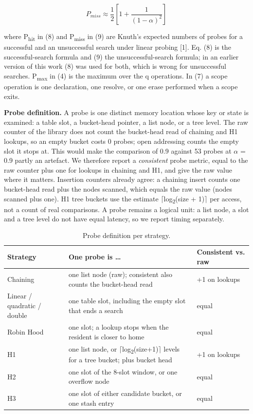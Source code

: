 \documentclass{ieeeaccess}
\begin{document}
\begin{equation}
P_{miss} \approx \frac{1}{2}\left[1+\frac{1}{(1-\alpha)^{2}}\right]
\end{equation}

where P\textsubscript{hit} in (8) and P\textsubscript{miss} in (9) are Knuth's expected numbers of probes for a successful and an unsuccessful search under linear probing [1]. Eq. (8) is the successful-search formula and (9) the unsuccessful-search formula; in an earlier version of this work (8) was used for both, which is wrong for unsuccessful searches. P\textsubscript{max} in (4) is the maximum over the q operations. In (7) a scope operation is one declaration, one resolve, or one erase performed when a scope exits.

\textbf{Probe definition.} A probe is one distinct memory location whose key or state is examined: a table slot, a bucket-head pointer, a list node, or a tree level. The raw counter of the library does not count the bucket-head read of chaining and H1 lookups, so an empty bucket costs 0 probes; open addressing counts the empty slot it stops at. This would make the comparison of 0.9 against 53 probes at $\alpha$ = 0.9 partly an artefact. We therefore report a \emph{consistent} probe metric, equal to the raw counter plus one for lookups in chaining and H1, and give the raw value where it matters. Insertion counters already agree: a chaining insert counts one bucket-head read plus the nodes scanned, which equals the raw value (nodes scanned plus one). H1 tree buckets use the estimate $\lceil$log\textsubscript{2}(size + 1)$\rceil$ per access, not a count of real comparisons. A probe remains a logical unit: a list node, a slot and a tree level do not have equal latency, so we report timing separately.

\begin{table}[!t]
\caption{Probe definition per strategy.}
\label{tab:3}
\centering
\scriptsize
\setlength{\tabcolsep}{3pt}
\begin{tabular}{|>{\raggedright\arraybackslash}p{}|>{\raggedright\arraybackslash}p{}|>{\raggedright\arraybackslash}p{}|}
\hline
\textbf{Strategy} & \textbf{One probe is \ldots{}} & \textbf{Consistent vs. raw} \\
\hline
Chaining & one list node (raw); consistent also counts the bucket-head read & +1 on lookups \\
Linear / quadratic / double & one table slot, including the empty slot that ends a search & equal \\
Robin Hood & one slot; a lookup stops when the resident is closer to home & equal \\
H1 & one list node, or $\lceil$log\textsubscript{2}(size+1)$\rceil$ levels for a tree bucket; plus bucket head & +1 on lookups \\
H2 & one slot of the 8-slot window, or one overflow node & equal \\
H3 & one slot of either candidate bucket, or one stash entry & equal \\
\hline
\end{tabular}
\end{table}
\end{document}
